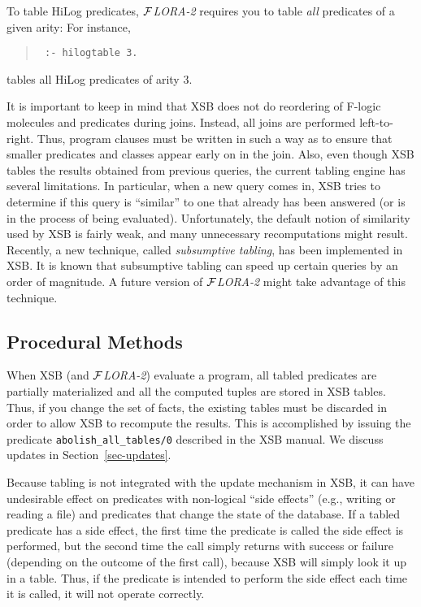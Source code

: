 \documentclass[11pt]{article}
\newcommand{\FLORA}{{\mbox{${\cal F}${\small\it LORA}\rm\emph{-2}}}\xspace}
\newcommand{\fl}{\mbox{F-logic}\xspace}
\begin{document}
To table HiLog predicates, \FLORA requires you to table \emph{all}
predicates of a given arity: For instance,
\begin{quote}
 \tt
 :- hilogtable 3.
\end{quote}
tables all HiLog predicates of arity 3.

It is important to keep in mind that XSB does not do reordering of \fl
molecules and predicates during joins. Instead, all joins are performed
left-to-right.  Thus, program clauses must be written in such a way as to
ensure that smaller predicates and classes appear early on in the join.
Also, even though XSB tables the results obtained from previous queries,
the current tabling engine has several limitations. In particular, when a
new query comes in, XSB tries to determine if this query is ``similar'' to
one that already has been answered (or is in the process of being
evaluated).  Unfortunately, the default notion of similarity used by XSB is
fairly weak, and many unnecessary recomputations might result. Recently, a
new technique, called \emph{subsumptive tabling}, has been implemented in
XSB. It is known that subsumptive tabling can speed up certain queries by
an order of magnitude. A future version of \FLORA might take advantage of
this technique.


\subsection{Procedural Methods}

When XSB (and \FLORA) evaluate a program, all tabled predicates are
partially materialized and all the computed tuples are stored in XSB
tables. Thus, if you change the set of facts, the existing tables must be
discarded in order to allow XSB to recompute the results. This is
accomplished by issuing the predicate {\tt abolish\_all\_tables/0}
described in the XSB manual. We discuss updates in
Section~\ref{sec-updates}.

%
Because tabling is not integrated with the update mechanism in XSB, it can
have undesirable effect on predicates with non-logical ``side effects''
(e.g., writing or reading a file) and predicates that change the state of
the database.  If a tabled predicate has a side effect, the first time the
predicate is called the side effect is performed, but the second time the
call simply returns with success or failure (depending on the outcome of
the first call), because XSB will simply look it up in a table.  Thus, if
the predicate is intended to perform the side effect each time it is
called, it will not operate correctly.
\end{document}
